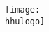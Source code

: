 \begin{frame}[plain]
  \begin{center}
    \texttt{[image: \\hhulogo]}
  \end{center}
  \vspace{-1cm}
  \titlepage
\end{frame}
